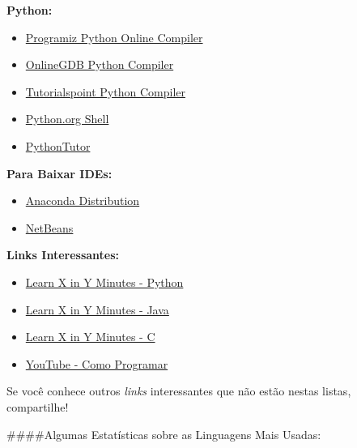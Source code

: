 \documentclass[12pt,a4paper]{article}
\providecommand{\tightlist}{%
      \setlength{\itemsep}{0pt}\setlength{\parskip}{0pt}}
\begin{document}
\textbf{Python:}

\begin{itemize}
\tightlist
\item
  \href{https://www.programiz.com/python-programming/online-compiler/}{Programiz
  Python Online Compiler}
\item
  \href{https://www.onlinegdb.com/online_python_compiler}{OnlineGDB
  Python Compiler}
\item
  \href{https://www.tutorialspoint.com/execute_python_online.php}{Tutorialspoint
  Python Compiler}
\item
  \href{https://www.python.org/shell/}{Python.org Shell}
\item
  \href{http://pythontutor.com}{PythonTutor}
\end{itemize}

\textbf{Para Baixar IDEs:}

\begin{itemize}
\tightlist
\item
  \href{https://www.anaconda.com/distribution}{Anaconda Distribution}
\item
  \href{https://netbeans.org}{NetBeans}
\end{itemize}

\textbf{Links Interessantes:}

\begin{itemize}
\tightlist
\item
  \href{https://learnxinyminutes.com/docs/python3}{Learn X in Y Minutes
  - Python}
\item
  \href{https://learnxinyminutes.com/docs/java}{Learn X in Y Minutes -
  Java}
\item
  \href{https://learnxinyminutes.com/docs/c}{Learn X in Y Minutes - C}
\item
  \href{https://youtu.be/UNSoPa-XQN0}{YouTube - Como Programar}
\end{itemize}

Se você conhece outros \emph{links} interessantes que não estão nestas
listas, compartilhe!

    \#\#\#\#Algumas Estatísticas sobre as Linguagens Mais Usadas:
\end{document}
